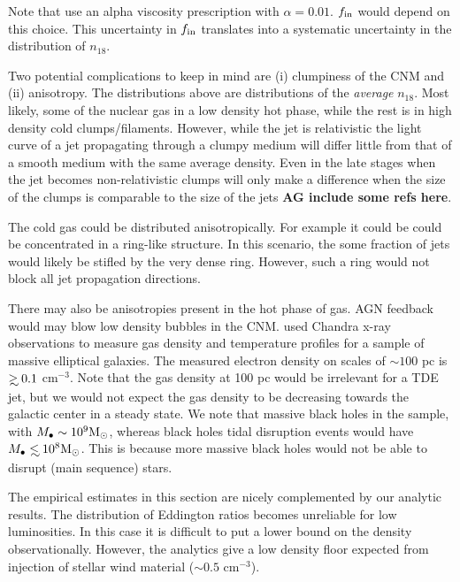 \documentclass[usenatbib,fleqn]{mnras}
\newcommand\lsim{\mathrel{\rlap{\lower4pt\hbox{\hskip1pt$\sim$}}
    \raise1pt\hbox{$<$}}}
\newcommand\gsim{\mathrel{\rlap{\lower4pt\hbox{\hskip1pt$\sim$}}
    \raise1pt\hbox{$>$}}}
\newcommand{\Mbh}[1][]{M_{\bullet#1}}
\newcommand{\Msun}{{\rm M_\odot}}
\begin{document}
Note that \citet{Li+2013} use an alpha viscosity prescription with
$\alpha=0.01$.  $f_{\rm in}$ would depend on this choice. This
uncertainty in $f_{\rm in}$ translates into a systematic uncertainty
in the distribution of $n_{18}$. 

Two potential complications to keep in mind are (i) clumpiness of the
CNM and (ii) anisotropy. The distributions above are distributions of
the {\it average} $n_{18}$.  Most likely, some of the nuclear gas in a
low density hot phase, while the rest is in high density cold
clumps/filaments.  However, while the jet is relativistic the
light curve of a jet propagating through a clumpy medium will differ
little from that of a smooth medium with the same average
density. Even in the late stages when the jet becomes non-relativistic
clumps will only make a difference when the size of the clumps is
comparable to the size of the jets {\bf AG include some refs here}.

The cold gas could be distributed anisotropically. For example it could
be could be concentrated in a ring-like structure. In this scenario,
the some fraction of jets would likely be stifled by the very dense
ring. However, such a ring would not block all jet propagation
directions. 

There may also be anisotropies present in the hot phase of gas. AGN
feedback would may blow low density bubbles in the
CNM. \citet{Russell+2013} used Chandra x-ray observations to measure
gas density and temperature profiles for a sample of massive
elliptical galaxies. The measured electron density on scales of $\sim
100$ pc is $\gsim 0.1$ cm$^{-3}$. Note that the gas density at 100 pc
would be irrelevant for a TDE jet, but we would not expect the gas
density to be decreasing towards the galactic center in a steady
state.  We note that massive black holes in the \citet{Russell+2013}
sample, with $\Mbh\sim 10^{9} \Msun$, whereas black holes tidal
disruption events would have $\Mbh\lsim 10^8 \Msun$. This is because
more massive black holes would not be able to disrupt (main sequence)
stars.


The empirical estimates in this section are nicely complemented by our
analytic results. The distribution of Eddington ratios becomes
unreliable for low luminosities.  In this case it is difficult to put
a lower bound on the density observationally. However, the analytics
give a low density floor expected from injection of stellar wind
material ($\sim 0.5$ cm$^{-3}$).

\end{document}
